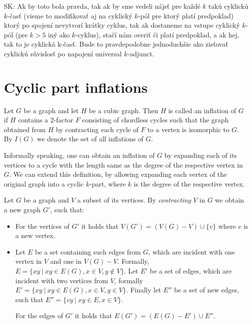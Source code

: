 SK: Ak by toto bola pravda, tak ak by sme vedeli nájsť pre každé $k$ takú cyklickú $k$-časť (vieme to modifikovať aj na cyklický $k$-pól pre ktorý platí predpoklad) ktorý po spojení nevytvorí krátky cyklus, tak ak dostaneme na vstupe cyklický $k$-pól (pre $k>5$ iný ako $k$-cyklus), stačí nám overiť či platí predpoklad, a ak hej, tak to je cyklická k-časť. Bude to pravdepodobne jednoduchšie ako zisťovať cyklickú súvislosť po napojení universal $k$-adjunct.

\section{Cyclic part inflations}\label{sec:cyclic-part-inflations}

\begin{definition}
	Let $G$ be a graph and let $H$ be a cubic graph. Then $H$ is called an inflation of $G$ if $H$ contains a 2-factor $F$ consisting of chordless cycles such that the graph obtained from $H$ by contracting each cycle of $F$ to a vertex is isomorphic to $G$. By $I(G)$ we denote the set of all inflations of $G$.
\end{definition}

Informally speaking, one can obtain an inflation of $G$ by expanding each of its vertices to a cycle with the length same as the degree of the respective vertex in $G$. We can extend this definition, by allowing expanding each vertex of the original graph into a cyclic $k$-part, where $k$ is the degree of the respective vertex.


Let $G$ be a graph and $V$ a subset of its vertices. By \textit{contracting} $V$ in $G$ we obtain a new graph $G'$, such that:
\begin{itemize}
	\item For the vertices of $G'$ it holds that $V(G') = (V(G)-V)\cup \{v\}$ where $v$ is a new vertex.
	\item Let $E$ be a set containing such edges from $G$, which are incident with one vertex in $V$ and one in $V(G)-V$. Formally, ${E=\{xy~|~xy\in E(G), x\in V, y\notin V\}}$. Let $E'$ be a set of edges, which are incident with two vertices from $V$, formally ${E'=\{xy ~|~ xy\in E(G), x\in V, y\in V\}}$. Finally let $E''$ be a set of new edges, such that $E''=\{vy~|~ xy\in E, x\in V\}$.
	
	 For the edges of $G'$ it holds that ${E(G')=(E(G)-E')\cup E''}$.
\end{itemize}

